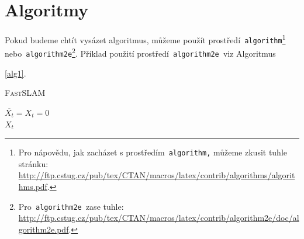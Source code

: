 \documentclass[11pt,a4paper]{article}
\begin{document}
\bigskip
\pagebreak

\section{Algoritmy}
\label{algoritmy}

Pokud budeme chtít vysázet algoritmus, můžeme použít prostředí\verb= algorithm=\footnote{Pro nápovědu, jak zacházet s prostředím\texttt{ algorithm,} můžeme zkusit tuhle stránku:\\
\href{http://ftp.cstug.cz/pub/tex/CTAN/macros/latex/contrib/algorithms/algorithms.pdf}{http://ftp.cstug.cz/pub/tex/CTAN/macros/latex/contrib/algorithms/algorithms.pdf}.} nebo\verb= algorithm2e=\footnote{
Pro\texttt{ algorithm2e }zase tuhle: \href{http://ftp.cstug.cz/pub/tex/CTAN/macros/latex/contrib/algorithm2e/doc/algorithm2e.pdf}{http://ftp.cstug.cz/pub/tex/CTAN/macros/latex/contrib/algorithm2e/doc/algorithm2e.pdf}.}.
Příklad použití prostředí\verb= algorithm2e =viz Algoritmus \begin{NoHyper}\ref{alg1}.\end{NoHyper}
\bigskip

\begin{algorithm}[ht]
\label{alg1}
    \caption{\textsc{FastSLAM}}
    \SetAlgoNoLine  
        \SetNlSty{}{}{:}
        \SetNlSkip{-12pt}
        \BlankLine
            \Indpp\Indp $\overline{X_t} = X_t = 0$ \\ 
            \Return $X_t$
\end{algorithm}
\end{document}
